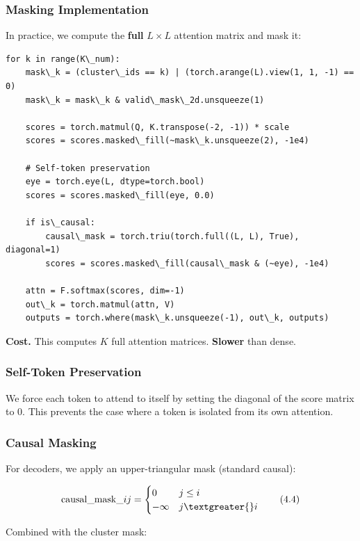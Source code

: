 \subsubsection{Masking Implementation}

In practice, we compute the \textbf{full} $L \times L$ attention matrix and mask 
it:

\begin{lstlisting}
for k in range(K\_num):
    mask\_k = (cluster\_ids == k) | (torch.arange(L).view(1, 1, -1) == 0)
    mask\_k = mask\_k & valid\_mask\_2d.unsqueeze(1)
    
    scores = torch.matmul(Q, K.transpose(-2, -1)) * scale
    scores = scores.masked\_fill(~mask\_k.unsqueeze(2), -1e4)
    
    # Self-token preservation
    eye = torch.eye(L, dtype=torch.bool)
    scores = scores.masked\_fill(eye, 0.0)
    
    if is\_causal:
        causal\_mask = torch.triu(torch.full((L, L), True), diagonal=1)
        scores = scores.masked\_fill(causal\_mask & (~eye), -1e4)
    
    attn = F.softmax(scores, dim=-1)
    out\_k = torch.matmul(attn, V)
    outputs = torch.where(mask\_k.unsqueeze(-1), out\_k, outputs)
\end{lstlisting}

\textbf{Cost.} This computes $K$ full attention matrices. \textbf{Slower} than dense.

\subsubsection{Self-Token Preservation}

We force each token to attend to itself by setting the diagonal of the score 
matrix to 0. This prevents the case where a token is isolated from its own 
attention.

\subsubsection{Causal Masking}

For decoders, we apply an upper-triangular mask (standard causal):

\[
\text{causal\_mask}\_{ij} = \begin{cases} 0 & j \leq i \\ -\infty & j \textgreater{} i \end{cases}
\tag{4.4}
\]

Combined with the cluster mask:

